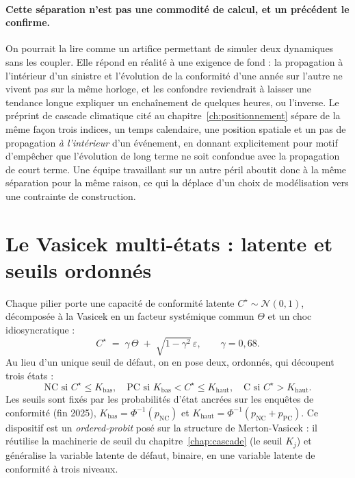 \paragraph{Cette séparation n'est pas une commodité de calcul, et un précédent le confirme.} On
pourrait la lire comme un artifice permettant de simuler deux dynamiques sans les coupler. Elle
répond en réalité à une exigence de fond : la propagation à l'intérieur d'un sinistre et
l'évolution de la conformité d'une année sur l'autre ne vivent pas sur la même horloge, et les
confondre reviendrait à laisser une tendance longue expliquer un enchaînement de quelques
heures, ou l'inverse. Le préprint de cascade climatique cité au chapitre~\ref{ch:positionnement}
\citep{ccrn2026} sépare de la même façon trois indices, un temps calendaire, une position
spatiale et un pas de propagation \emph{à l'intérieur} d'un événement, en donnant explicitement
pour motif d'empêcher que l'évolution de long terme ne soit confondue avec la propagation de
court terme. Une équipe travaillant sur un autre péril aboutit donc à la même séparation pour la
même raison, ce qui la déplace d'un choix de modélisation vers une contrainte de construction.

\section{Le Vasicek multi-états : latente et seuils ordonnés}

Chaque pilier porte une capacité de conformité latente $C^\star\sim\mathcal N(0,1)$,
décomposée à la Vasicek en un facteur systémique commun $\Theta$ et un choc idiosyncratique :
\begin{equation}
C^\star \;=\; \gamma\,\Theta \;+\; \sqrt{1-\gamma^2}\,\varepsilon, \qquad \gamma=0{,}68.
\end{equation}
Au lieu d'un unique seuil de défaut, on en pose deux, ordonnés, qui découpent trois
états :
\begin{equation}
\text{NC si } C^\star\le K_{\text{bas}}, \quad
\text{PC si } K_{\text{bas}}<C^\star\le K_{\text{haut}}, \quad
\text{C si } C^\star>K_{\text{haut}}.
\end{equation}
Les seuils sont fixés par les probabilités d'état ancrées sur les enquêtes de
conformité (fin 2025), $K_{\text{bas}}=\Phi^{-1}(p_{\text{NC}})$ et
$K_{\text{haut}}=\Phi^{-1}(p_{\text{NC}}+p_{\text{PC}})$. Ce dispositif est un
\emph{ordered-probit} posé sur la structure de Merton-Vasicek : il réutilise la machinerie de
seuil du chapitre~\ref{chap:cascade} (le seuil $K_j$) et généralise la variable latente de
défaut, binaire, en une variable latente de conformité à trois niveaux.

